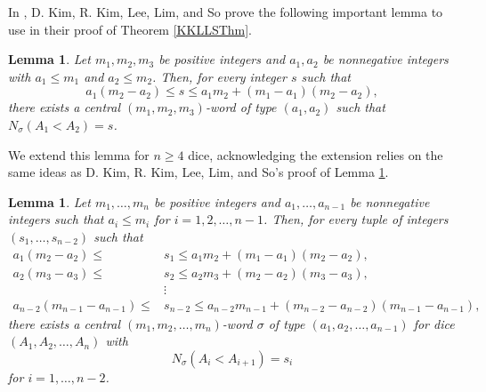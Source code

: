 \documentclass[11pt]{article}
\newtheorem{lemma}[theorem]{Lemma}
\theoremstyle{definition}
\begin{document}
In \cite{KKLLS2024}, D. Kim, R. Kim, Lee, Lim, and So prove the following important lemma to use in their proof of Theorem \ref{KKLLSThm}.
\begin{lemma} \label{KKLLSLemma}
    \cite{KKLLS2024} Let $m_1,m_2,m_3$ be positive integers and $a_1,a_2$ be nonnegative integers with $a_1 \leq m_1$ and $a_2 \leq m_2$. Then, for every integer $s$ such that
    $$a_1(m_2-a_2) \leq s \leq a_1m_2 + (m_1-a_1)(m_2-a_2),$$
    there exists a central $(m_1,m_2,m_3)$-word of type $(a_1,a_2)$ such that $N_\sigma(A_1<A_2) = s$.
\end{lemma}

We extend this lemma for $n \geq 4$ dice, acknowledging the extension relies on the same ideas as D. Kim, R. Kim, Lee, Lim, and So's proof of Lemma \ref{KKLLSLemma}.

\begin{lemma} \label{mainLem1}
    Let $m_1,\dots, m_n$ be positive integers and $a_1,\dots, a_{n-1}$ be nonnegative integers such that $a_i\leq m_i$ for $i=1,2,\dots, n-1$. Then, for every tuple of integers $(s_1,\dots, s_{n-2})$ such that
    \begin{equation}\label{mainLem1Ineqs}
    \begin{split}
        a_1(m_2-a_2) \leq &s_1 \leq a_1m_2 + (m_1-a_1)(m_2-a_2), \\
        a_2(m_3-a_3) \leq &s_2 \leq a_2m_3 + (m_2-a_2)(m_3-a_3), \\
        &\vdots \\
        a_{n-2}(m_{n-1}-a_{n-1}) \leq &s_{n-2} \leq a_{n-2}m_{n-1} + (m_{n-2}-a_{n-2})(m_{n-1}-a_{n-1}),
    \end{split}
    \end{equation}
    there exists a central $(m_1,m_2,\dots, m_n)$-word $\sigma$ of type $(a_1,a_2,\dots,a_{n-1})$ for dice $(A_1,A_2,\dots, A_n)$ with
    $$N_\sigma(A_i < A_{i+1}) = s_i$$
    for $i = 1,\dots,n-2$.
\end{lemma}
\end{document}
